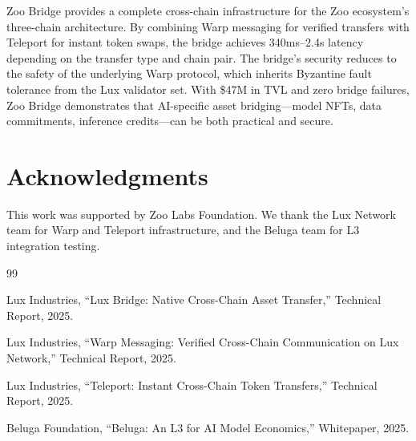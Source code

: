 \documentclass[11pt,letterpaper]{article}
\begin{document}
Zoo Bridge provides a complete cross-chain infrastructure for the Zoo ecosystem's three-chain architecture. By combining Warp messaging for verified transfers with Teleport for instant token swaps, the bridge achieves 340ms--2.4s latency depending on the transfer type and chain pair. The bridge's security reduces to the safety of the underlying Warp protocol, which inherits Byzantine fault tolerance from the Lux validator set. With \$47M in TVL and zero bridge failures, Zoo Bridge demonstrates that AI-specific asset bridging---model NFTs, data commitments, inference credits---can be both practical and secure.

\section*{Acknowledgments}

This work was supported by Zoo Labs Foundation. We thank the Lux Network team for Warp and Teleport infrastructure, and the Beluga team for L3 integration testing.


\begin{thebibliography}{99}

Lux Industries, ``Lux Bridge: Native Cross-Chain Asset Transfer,'' Technical Report, 2025.

Lux Industries, ``Warp Messaging: Verified Cross-Chain Communication on Lux Network,'' Technical Report, 2025.

Lux Industries, ``Teleport: Instant Cross-Chain Token Transfers,'' Technical Report, 2025.

Beluga Foundation, ``Beluga: An L3 for AI Model Economics,'' Whitepaper, 2025.

\end{thebibliography}
\end{document}
